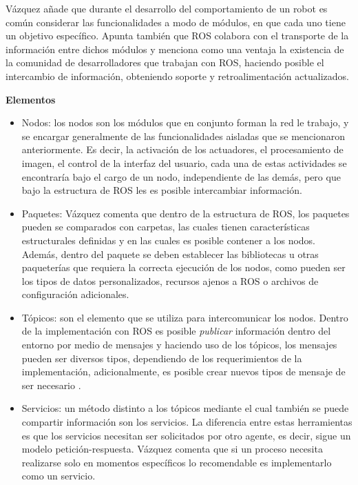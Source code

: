             Vázquez añade que durante el desarrollo del comportamiento de un robot es común considerar las funcionalidades a modo de módulos, en que cada uno tiene un objetivo específico. Apunta también que ROS colabora con el transporte de la información entre dichos módulos y menciona como una ventaja la existencia de la comunidad de desarrolladores que trabajan con ROS, haciendo posible el intercambio de información, obteniendo soporte y retroalimentación actualizados. \phantom{saltodelineaforzado >:D\\}

            \textbf{Elementos}
            \begin{itemize}
                \item Nodos: los nodos son los módulos que en conjunto forman la red le trabajo, y se encargar generalmente de las funcionalidades aisladas que se mencionaron anteriormente. Es decir, la activación de los actuadores, el procesamiento de imagen, el control de la interfaz del usuario, cada una de estas actividades se encontraría bajo el cargo de un nodo, independiente de las demás, pero que bajo la estructura de ROS les es posible intercambiar información.
                \item Paquetes: Vázquez comenta que dentro de la estructura de ROS, los paquetes pueden se comparados con carpetas, las cuales tienen características estructurales definidas y en las cuales es posible contener a los nodos. Además, dentro del paquete se deben establecer las bibliotecas u otras paqueterías que requiera la correcta ejecución de los nodos, como pueden ser los tipos de datos personalizados, recursos ajenos a ROS o archivos de configuración adicionales. 
                \item Tópicos: son el elemento que se utiliza para intercomunicar los nodos. Dentro de la implementación con ROS es posible \textit{publicar} información dentro del entorno por medio de mensajes y haciendo uso de los tópicos, los mensajes pueden ser diversos tipos, dependiendo de los requerimientos de la implementación, adicionalmente, es posible crear nuevos tipos de mensaje de ser necesario \cite{ros_wiki_std_msgs}. 
                \item Servicios: un método distinto a los tópicos mediante el cual también se puede compartir información son los servicios. La diferencia entre estas herramientas es que los servicios necesitan ser solicitados por otro agente, es decir, sigue un modelo petición-respuesta. Vázquez comenta que si un proceso necesita realizarse solo en momentos específicos lo recomendable es implementarlo como un servicio.
            \end{itemize}

